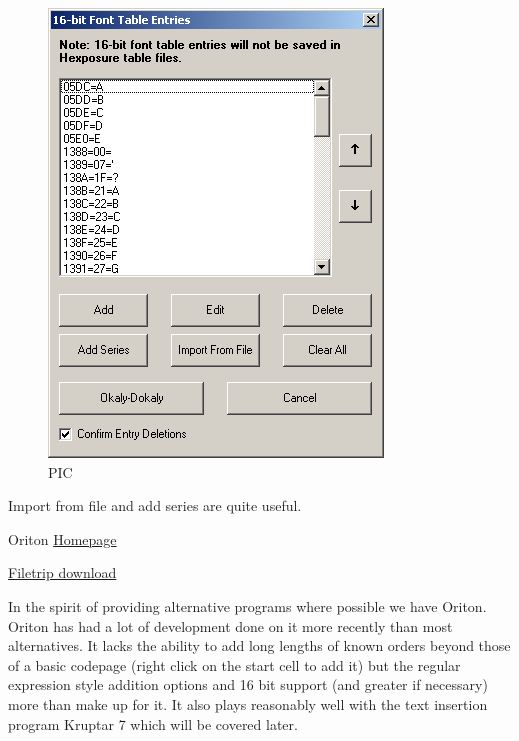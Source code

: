 \documentclass[
]{book}
\begin{document}
\begin{figure}
\centering
\includegraphics{images/99_home_fast6191_romhackingguide_unrenamed_file___al_borders_romhackingguidertexttablemaking2.png}
\caption{PIC}
\end{figure}

Import from file and add series are quite useful.

Oriton \href{http://www.magicteam.net/index.php?page=programs\&show=Oriton}{Homepage}

\href{http://filetrip.net/pc-downloads/applications/latest-oriton-f29376.html}{Filetrip download}

In the spirit of providing alternative programs where possible we have Oriton. Oriton has had a lot of development done on it more recently than most alternatives. It lacks the ability to add long lengths of known orders beyond those of a basic codepage (right click on the start cell to add it) but the regular expression style addition options and 16 bit support (and greater if necessary) more than make up for it. It also plays reasonably well with the text insertion program Kruptar 7 which will be covered later.
\end{document}
